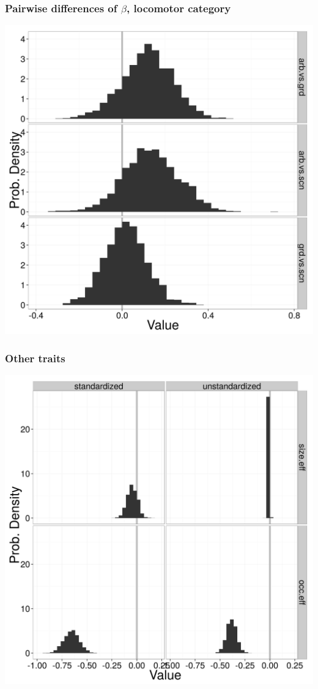 \documentclass{beamer}
\begin{document}
\begin{frame}
  \frametitle{Pairwise differences of \(\beta\), locomotor category}
  \begin{center}
    \includegraphics[height = 0.8\textheight, width = \textwidth,  keepaspectratio = true]{figure/loco_diff_est}
  \end{center}
\end{frame}

\begin{frame}
  \frametitle{Other traits}
  \begin{center}
    \includegraphics[height = 0.8\textheight, width = \textwidth,  keepaspectratio = true]{figure/other_est}
  \end{center}
\end{frame}
\end{document}
